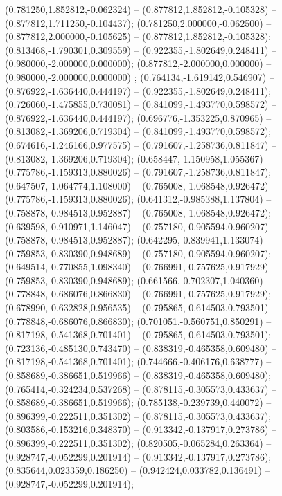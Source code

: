  (0.781250,1.852812,-0.062324) -- (0.877812,1.852812,-0.105328) -- (0.877812,1.711250,-0.104437);
 (0.781250,2.000000,-0.062500) -- (0.877812,2.000000,-0.105625) -- (0.877812,1.852812,-0.105328);
 (0.813468,-1.790301,0.309559) -- (0.922355,-1.802649,0.248411) -- (0.980000,-2.000000,0.000000);
 (0.877812,-2.000000,0.000000) -- (0.980000,-2.000000,0.000000) ;
 (0.764134,-1.619142,0.546907) -- (0.876922,-1.636440,0.444197) -- (0.922355,-1.802649,0.248411);
 (0.726060,-1.475855,0.730081) -- (0.841099,-1.493770,0.598572) -- (0.876922,-1.636440,0.444197);
 (0.696776,-1.353225,0.870965) -- (0.813082,-1.369206,0.719304) -- (0.841099,-1.493770,0.598572);
 (0.674616,-1.246166,0.977575) -- (0.791607,-1.258736,0.811847) -- (0.813082,-1.369206,0.719304);
 (0.658447,-1.150958,1.055367) -- (0.775786,-1.159313,0.880026) -- (0.791607,-1.258736,0.811847);
 (0.647507,-1.064774,1.108000) -- (0.765008,-1.068548,0.926472) -- (0.775786,-1.159313,0.880026);
 (0.641312,-0.985388,1.137804) -- (0.758878,-0.984513,0.952887) -- (0.765008,-1.068548,0.926472);
 (0.639598,-0.910971,1.146047) -- (0.757180,-0.905594,0.960207) -- (0.758878,-0.984513,0.952887);
 (0.642295,-0.839941,1.133074) -- (0.759853,-0.830390,0.948689) -- (0.757180,-0.905594,0.960207);
 (0.649514,-0.770855,1.098340) -- (0.766991,-0.757625,0.917929) -- (0.759853,-0.830390,0.948689);
 (0.661566,-0.702307,1.040360) -- (0.778848,-0.686076,0.866830) -- (0.766991,-0.757625,0.917929);
 (0.678990,-0.632828,0.956535) -- (0.795865,-0.614503,0.793501) -- (0.778848,-0.686076,0.866830);
 (0.701051,-0.560751,0.850291) -- (0.817198,-0.541368,0.701401) -- (0.795865,-0.614503,0.793501);
 (0.723136,-0.485130,0.743470) -- (0.838319,-0.465358,0.609480) -- (0.817198,-0.541368,0.701401);
 (0.744666,-0.406176,0.638777) -- (0.858689,-0.386651,0.519966) -- (0.838319,-0.465358,0.609480);
 (0.765414,-0.324234,0.537268) -- (0.878115,-0.305573,0.433637) -- (0.858689,-0.386651,0.519966);
 (0.785138,-0.239739,0.440072) -- (0.896399,-0.222511,0.351302) -- (0.878115,-0.305573,0.433637);
 (0.803586,-0.153216,0.348370) -- (0.913342,-0.137917,0.273786) -- (0.896399,-0.222511,0.351302);
 (0.820505,-0.065284,0.263364) -- (0.928747,-0.052299,0.201914) -- (0.913342,-0.137917,0.273786);
 (0.835644,0.023359,0.186250) -- (0.942424,0.033782,0.136491) -- (0.928747,-0.052299,0.201914);
